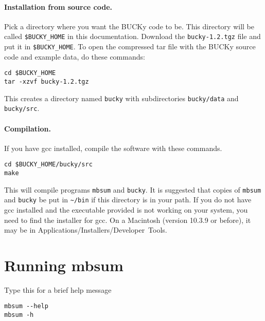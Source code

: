 \documentclass[12pt,english,final,letterpaper]{article}
\newcommand{\bu}{BUCKy}
\begin{document}
\paragraph{Installation from source code.}
Pick a directory where you want the \bu{} code to be. This directory 
will be called \verb+$BUCKY_HOME+ in this documentation.
Download the {\tt bucky-1.2.tgz} file and put it in \verb+$BUCKY_HOME+.
To open the compressed tar file with the \bu{} source code 
and example data, do these commands:
\begin{verbatim}
cd $BUCKY_HOME
tar -xzvf bucky-1.2.tgz
\end{verbatim}              %
This creates a directory named {\tt bucky} with subdirectories
{\tt bucky/data} and {\tt bucky/src}.

\paragraph{Compilation.} If you have gcc installed, compile
the software with these commands.
\begin{verbatim}
cd $BUCKY_HOME/bucky/src
make
\end{verbatim}   %
This will compile programs {\tt mbsum} and {\tt bucky}.
It is suggested that copies of {\tt mbsum} and {\tt bucky}
be put in \verb+~/bin+ if this directory is in your path.
If you do not have gcc installed and the executable provided
is not working on your system, you need to find the installer
for gcc. On a Macintosh (version 10.3.9 or before), it may be in 
Applications/Installers/Developer~Tools.

\section{Running mbsum}
Type this for a brief help message
\begin{verbatim}
mbsum --help
mbsum -h
\end{verbatim}
\end{document}
